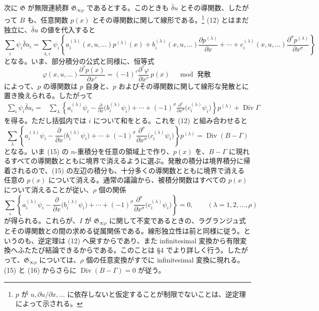 \documentclass[11pt]{article}
\providecommand{\Div}{\operatorname{Div}}
\providecommand{\G}{\mathfrak G}
\providecommand{\bd}{\bar{\delta}}
\providecommand{\p}{\partial}
\begin{document}
次に \(\G\) が無限連続群 \(\G_{\infty\rho}\) であるとする。このときも \(\bd u\) とその導関数、したがって \(B\) も、任意関数 \(p(x)\) とその導関数に関して線形である。\footnote{\(p\) が \(u,\p u/\p x,\ldots\) に依存しないと仮定することが制限でないことは、逆定理によって示される。} (12) とはまだ独立に、\(\bd u\) の値を代入すると
\[
\sum_i\psi_i\bd u_i
=\sum_{\lambda,i}\psi_i\left\{
a_i^{(\lambda)}(x,u,\ldots)p^{(\lambda)}(x)
+b_i^{(\lambda)}(x,u,\ldots)\frac{\p p^{(\lambda)}}{\p x}
+\cdots+c_i^{(\lambda)}(x,u,\ldots)
\frac{\p^\sigma p^{(\lambda)}}{\p x^\sigma}\right\}
\]
となる。いま、部分積分の公式と同様に、恒等式
\[
\varphi(x,u,\ldots)\frac{\p^\tau p(x)}{\p x^\tau}
=(-1)^\tau\frac{\p^\tau\varphi}{\p x^\tau}\,p(x)
\quad \bmod \text{ 発散}
\]
によって、\(p\) の導関数は \(p\) 自身と、\(p\) およびその導関数に関して線形な発散とに置き換えられる。したがって
\begin{equation}
\begin{aligned}
\sum_i\psi_i\bd u_i
={}&\sum_\lambda\left\{
a_i^{(\lambda)}\psi_i-\frac{\p}{\p x}\bigl(b_i^{(\lambda)}\psi_i\bigr)
+\cdots+(-1)^\sigma
\frac{\p^\sigma}{\p x^\sigma}\bigl(c_i^{(\lambda)}\psi_i\bigr)
\right\}p^{(\lambda)}+\Div\Gamma
\end{aligned}
\tag{14}
\end{equation}
を得る。ただし括弧内では \(i\) について和をとる。これを (12) と組み合わせると
\begin{equation}
\sum_\lambda\left\{
a_i^{(\lambda)}\psi_i-\frac{\p}{\p x}\bigl(b_i^{(\lambda)}\psi_i\bigr)
+\cdots+(-1)^\sigma
\frac{\p^\sigma}{\p x^\sigma}\bigl(c_i^{(\lambda)}\psi_i\bigr)
\right\}p^{(\lambda)}
=\Div(B-\Gamma)
\tag{15}
\end{equation}
となる。いま (15) の \(n\)-重積分を任意の領域上で作り、\(p(x)\) を、\(B-\Gamma\) に現れるすべての導関数とともに境界で消えるように選ぶ。発散の積分は境界積分に帰着されるので、(15) の左辺の積分も、十分多くの導関数とともに境界で消える任意の \(p(x)\) について消える。通常の議論から、被積分関数はすべての \(p(x)\) について消えることが従い、\(\rho\) 個の関係
\begin{equation}
\sum_i\left\{
a_i^{(\lambda)}\psi_i-\frac{\p}{\p x}\bigl(b_i^{(\lambda)}\psi_i\bigr)
+\cdots+(-1)^\sigma
\frac{\p^\sigma}{\p x^\sigma}\bigl(c_i^{(\lambda)}\psi_i\bigr)
\right\}=0,\qquad(\lambda=1,2,\ldots,\rho)
\tag{16}
\end{equation}
が得られる。これらが、\(I\) が \(\G_{\infty\rho}\) に関して不変であるときの、ラグランジュ式とその導関数との間の求める従属関係である。線形独立性は前と同様に従う。というのも、逆定理は (12) へ戻すからであり、また infinitesimal 変換から有限変換へふたたび結論できるからである。このことは \S{}4 でより詳しく行う。したがって、\(\G_{\infty\rho}\) については、\(\rho\) 個の任意変換がすでに infinitesimal 変換に現れる。(15) と (16) からさらに \(\Div(B-\Gamma)=0\) が従う。
\end{document}
